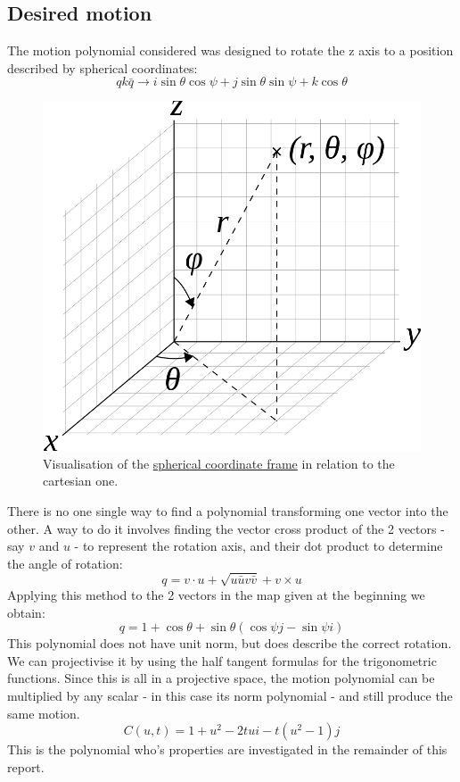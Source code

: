 \subsection{Desired motion}
The motion polynomial considered was designed to rotate the z axis to a position described by spherical coordinates:
\begin{equation}
    qk\bar{q} \rightarrow i \sin{\theta}\cos{\psi}  +  j \sin{\theta}\sin{\psi}  + k\cos{\theta}
\end{equation}

\begin{figure}[h!]
    \centering
    \includegraphics[scale=0.3]{img/831px-3D_Spherical_2.png}
    \caption{Visualisation of the \href{  https://en.wikipedia.org/wiki/Spherical_coordinate_system }{spherical coordinate frame} in relation to the cartesian one.}
    \label{fig:enter-label}
\end{figure}

There is no one single way to find a polynomial transforming one vector into the other. A way to do it involves finding the vector cross product of the 2 vectors - say $v$ and  $u$ - to represent the rotation axis, and their dot product to determine the angle of rotation:
\begin{equation}
    q = v\cdot u + \sqrt{u\bar{u}v\bar{v}} + v \times u
\end{equation}
Applying this method to the 2 vectors in the map given at the beginning we obtain:
\begin{equation}
    q = 1 + \cos{\theta} + \sin{\theta}(\cos{\psi}j-\sin{\psi}i)
\end{equation}
This polynomial does not have unit norm, but does describe the correct rotation.
We can projectivise it by using the half tangent formulas for the trigonometric functions. Since this is all in a projective space, the motion polynomial can be multiplied by any scalar - in this case its norm polynomial - and still produce the same motion.
\begin{equation}
    C(u,t) = 1+u^{2}-2tui - t(u^{2}-1)j
\end{equation}
This is the polynomial who's properties are investigated in the remainder of this report. 
